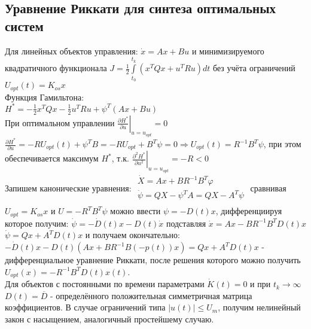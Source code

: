 \documentclass[preprint,russian,a5paper,10pt,twoside,mediummath]{ncc}
\begin{document}
 \subsection{Уравнение Риккати для синтеза оптимальных систем\label{synthesis:Riccati}}
 \par Для линейных объектов управления: $\dot{x}=Ax+Bu$ и минимизируемого квадратичного функционала $J=\frac{1}{2}\int\limits_{{{t}_{0}}}^{{{t}_{k}}}{\left( {{x}^{T}}Qx+{{u}^{T}}Ru \right)dt}$ без учёта ограничений ${{U}_{opt}}\left( t \right)={{K}_{os}}x$ 
 \\Функция Гамильтона:
 \\${{H}^{*}}=-\frac{1}{2}{{x}^{T}}Qx-\frac{1}{2}{{u}^{T}}Ru+{{\psi }^{T}}\left( Ax+Bu \right)$
 \\При оптимальном управлении ${{\left. \frac{\partial {{H}^{*}}}{\partial u} \right|}_{u={{u}_{opt}}}}=0$ $\frac{\partial {{H}^{*}}}{\partial u}=-R{{U}_{opt}}\left( t \right)+{{\psi }^{T}}B=-R{{U}_{opt}}+{{B}^{T}}\psi =0\Rightarrow {{U}_{opt}}\left( t \right)={{R}^{-1}}{{B}^{T}}\psi $, при этом обеспечивается максимум ${{H}^{*}}$, т.к. ${{\left. \frac{{{\partial }^{2}}{{H}^{*}}}{\partial {{u}^{2}}} \right|}_{u={{u}_{opt}}}}=-R<0$
 \\Запишем канонические уравнения: $\begin{array}{*{35}{l}}
   \dot{X}=Ax+B{{R}^{-1}}{{B}^{T}}\varphi   \\
   \dot{\psi }=QX-{{\psi }^{T}}A=QX-{{A}^{T}}\psi   \\
\end{array}$ сравнивая ${{U}_{opt}}={{K}_{os}}x$ и $U=-{{R}^{T}}{{B}^{T}}\psi $ можно ввести $\psi =-D\left( t \right)x$, дифференциируя которое получим: $\dot{\psi }=-\dot{D}\left( t \right)x-D\left( t \right)\dot{x}$ подставляя $\dot{x}=Ax-B{{R}^{-1}}{{B}^{T}}D\left( t \right)x$ $\dot{\psi }=Qx+{{A}^{T}}D\left( t \right)x$ и получаем окончательно:
\\$-\dot{D}\left( t \right)x-D\left( t \right)\left( Ax+B{{R}^{-1}}B\left( -p\left( t \right) \right)x \right)=Qx+{{A}^{T}}D\left( t \right)x$ - дифференциальное уравнение Риккати, после решения которого можно получить ${{U}_{opt}}\left( x \right)=-{{R}^{-1}}{{B}^{T}}D\left( t \right)x\left( t \right)$.
\\Для объектов с постоянными по времени параметрами $\dot{K}\left( t \right)=0$ и при ${{t}_{k}}\to \infty $ $D\left( t \right)=\overline{D}$ - определённого положительная симметричная матрица коэффициентов. В случае ограничений типа $\left| u\left( t \right) \right|\le {{U}_{m}}$, получим нелинейный закон с насыщением, аналогичный простейшему случаю.   
\end{document}
